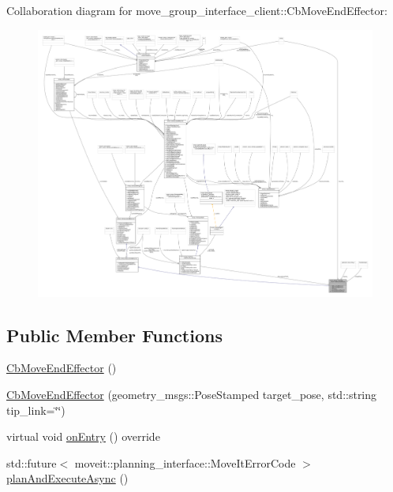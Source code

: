 Collaboration diagram for move\+\_\+group\+\_\+interface\+\_\+client\+:\+:Cb\+Move\+End\+Effector\+:
\nopagebreak
\begin{figure}[H]
\begin{center}
\leavevmode
\includegraphics[width=350pt]{classmove__group__interface__client_1_1CbMoveEndEffector__coll__graph}
\end{center}
\end{figure}
\subsection*{Public Member Functions}
\begin{DoxyCompactItemize}
\item 
\hyperlink{classmove__group__interface__client_1_1CbMoveEndEffector_af099daf41522868d1ad8e9c9cf4f73e3}{Cb\+Move\+End\+Effector} ()
\item 
\hyperlink{classmove__group__interface__client_1_1CbMoveEndEffector_a2c04d1059de71a90b87cb23b8de2a45d}{Cb\+Move\+End\+Effector} (geometry\+\_\+msgs\+::\+Pose\+Stamped target\+\_\+pose, std\+::string tip\+\_\+link=\char`\"{}\char`\"{})
\item 
virtual void \hyperlink{classmove__group__interface__client_1_1CbMoveEndEffector_acd7f50c949fcf6e7c56b285439b0b1de}{on\+Entry} () override
\item 
std\+::future$<$ moveit\+::planning\+\_\+interface\+::\+Move\+It\+Error\+Code $>$ \hyperlink{classmove__group__interface__client_1_1CbMoveEndEffector_a1d01b53676a8066f726c59a96a9fe107}{plan\+And\+Execute\+Async} ()
\end{DoxyCompactItemize}
